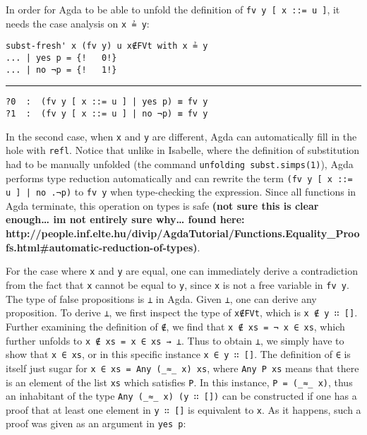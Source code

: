 \documentclass[a4paper, 12pt, twoside]{style/ociamthesis}
\theoremstyle{plain}
\theoremstyle{definition}
\theoremstyle{remark}
\begin{document}
In order for Agda to be able to unfold the definition of
\texttt{fv y [ x ::= u ]}, it needs the case analysis on \texttt{x ≟ y}:

\begin{verbatim}
subst-fresh' x (fv y) u x∉FVt with x ≟ y
... | yes p = {!   0!}
... | no ¬p = {!   1!}
\end{verbatim}

\noindent\rule{8cm}{0.4pt}

\begin{verbatim}
?0  :  (fv y [ x ::= u ] | yes p) ≡ fv y
?1  :  (fv y [ x ::= u ] | no ¬p) ≡ fv y
\end{verbatim}

In the second case, when \texttt{x} and \texttt{y} are different, Agda
can automatically fill in the hole with \texttt{refl}. Notice that
unlike in Isabelle, where the definition of substitution had to be
manually unfolded (the command \texttt{unfolding subst.simps(1)}), Agda
performs type reduction automatically and can rewrite the term
\texttt{(fv y [ x ::= u ] | no .¬p)} to \texttt{fv y} when type-checking
the expression. Since all functions in Agda terminate, this operation on
types is safe \textbf{(not sure this is clear enough\ldots{} im not
entirely sure why\ldots{} found here:
http://people.inf.elte.hu/divip/AgdaTutorial/Functions.Equality\_Proofs.html\#automatic-reduction-of-types)}.

For the case where \texttt{x} and \texttt{y} are equal, one can
immediately derive a contradiction from the fact that \texttt{x} cannot
be equal to \texttt{y}, since \texttt{x} is not a free variable in
\texttt{fv y}. The type of false propositions is \texttt{⊥} in Agda.
Given \texttt{⊥}, one can derive any proposition. To derive \texttt{⊥},
we first inspect the type of \texttt{x∉FVt}, which is
\texttt{x ∉ y ∷ []}. Further examining the definition of \texttt{∉}, we
find that \texttt{x ∉ xs = ¬ x ∈ xs}, which further unfolds to
\texttt{x ∉ xs = x ∈ xs → ⊥}. Thus to obtain \texttt{⊥}, we simply have
to show that \texttt{x ∈ xs}, or in this specific instance
\texttt{x ∈ y ∷ []}. The definition of \texttt{∈} is itself just sugar
for \texttt{x ∈ xs = Any (\_≈\_ x) xs}, where \texttt{Any P xs} means
that there is an element of the list \texttt{xs} which satisfies
\texttt{P}. In this instance, \texttt{P = (\_≈\_ x)}, thus an inhabitant
of the type \texttt{Any (\_≈\_ x) (y ∷ [])} can be constructed if one
has a proof that at least one element in \texttt{y ∷ []} is equivalent
to \texttt{x}. As it happens, such a proof was given as an argument in
\texttt{yes p}:
\end{document}
